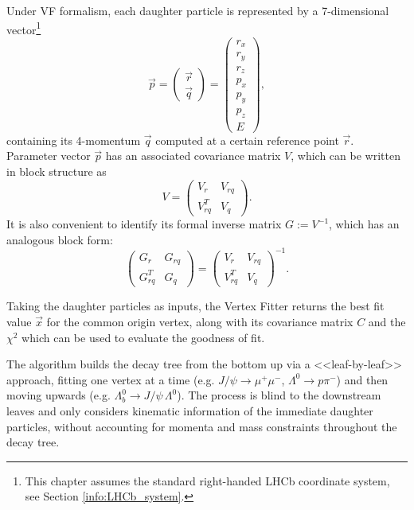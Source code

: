 Under VF formalism, each daughter particle is represented by a 7-dimensional vector\footnote{This chapter assumes the standard right-handed LHCb coordinate system, see Section \ref{info:LHCb_system}.}
\begin{equation}
	\vec{p} = \begin{pmatrix}
		\vec{r} \\ \vec{q}
	\end{pmatrix}
	=
	\begin{pmatrix}
		r_x \\ r_y \\ r_z \\ p_x \\ p_y \\ p_z \\ E
	\end{pmatrix},
	\label{eq:particle_representation}
\end{equation}
containing its 4-momentum $\vec{q}$ computed at a certain reference point $\vec{r}$.
Parameter vector $\vec{p}$ has an associated covariance matrix $V$, which can be written in block structure as
\begin{equation}
	V = \begin{pmatrix}
		V_r      & V_{rq} \\
		V_{rq}^T & V_q
	\end{pmatrix}.
	\label{eq:par_covmatrix}
\end{equation}
It is also convenient to identify its formal inverse matrix $G := V^{-1}$, which has an analogous block form:
\begin{equation}
	\begin{pmatrix}
		G_r      & G_{rq} \\
		G_{rq}^T & G_q
	\end{pmatrix}
	=
	\begin{pmatrix}
		V_r      & V_{rq} \\
		V_{rq}^T & V_q
	\end{pmatrix}^{-1}.
\end{equation}

Taking the daughter particles as inputs, the Vertex Fitter returns the best fit value $\vec{x}$ for the common origin vertex, along with its covariance matrix $C$ and the $\chi^2$ which can be used to evaluate the goodness of fit.

The algorithm builds the decay tree from the bottom up via a <<leaf-by-leaf>> approach, fitting one vertex at a time (e.g. $J/\psi \rightarrow \mu^+ \mu^-$, $\Lambda^0 \rightarrow p \pi^-$) and then moving upwards (e.g. $\Lambda_b^0 \rightarrow J/\psi\,\Lambda^0$).
The process is blind to the downstream leaves and only considers kinematic information of the immediate daughter particles, without accounting for momenta and mass constraints throughout the decay tree.

